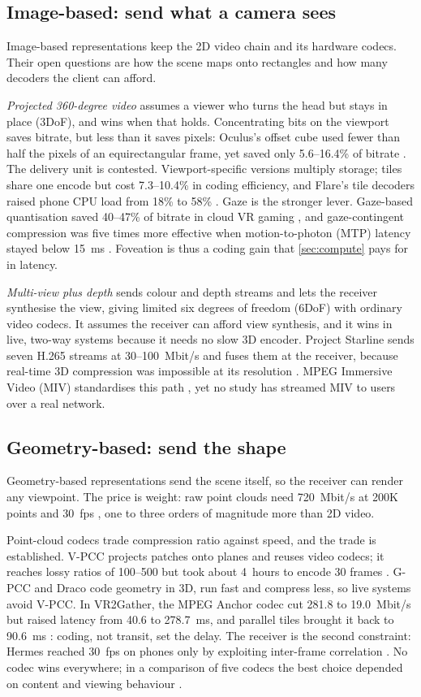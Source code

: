 \subsection{Image-based: send what a camera sees}
Image-based representations keep the 2D video chain and its hardware codecs. Their open questions are
how the scene maps onto rectangles and how many decoders the client can afford.

\emph{Projected 360-degree video} assumes a viewer who turns the head but stays in place (3DoF), and wins
when that holds. Concentrating bits on the viewport saves bitrate, but less than it saves pixels:
Oculus's offset cube used fewer than half the pixels of an equirectangular frame, yet saved only
5.6--16.4\% of bitrate \cite{W2623027537}. The delivery unit is contested. Viewport-specific versions
multiply storage; tiles share one encode but cost 7.3--10.4\% in coding efficiency, and Flare's tile
decoders raised phone CPU load from 18\% to 58\% \cite{W2896840651}. Gaze is the stronger lever.
Gaze-based quantisation saved 40--47\% of bitrate in cloud VR gaming \cite{W3174397927}, and
gaze-contingent compression was five times more effective when motion-to-photon (MTP) latency stayed
below 15~ms \cite{W4214531162}. Foveation is thus a coding gain that \cref{sec:compute} pays for in
latency.

\emph{Multi-view plus depth} sends colour and depth streams and lets the receiver synthesise the view,
giving limited six degrees of freedom (6DoF) with ordinary video codecs. It assumes the receiver can
afford view synthesis, and it wins in live, two-way systems because it needs no slow 3D encoder. Project
Starline sends seven H.265 streams at 30--100~Mbit/s and fuses them at the receiver, because real-time
3D compression was impossible at its resolution \cite{W4200107448}. MPEG Immersive
Video (MIV) standardises this path \cite{W4210296418}, yet no study has streamed MIV to users over a real
network.

\subsection{Geometry-based: send the shape}
Geometry-based representations send the scene itself, so the receiver can render any viewpoint. The
price is weight: raw point clouds need 720~Mbit/s at 200K points and 30~fps \cite{W3021314748}, one to
three orders of magnitude more than 2D video.

Point-cloud codecs trade compression ratio against speed, and the trade is established. V-PCC projects
patches onto planes and reuses video codecs; it reaches lossy ratios of 100--500 but took about 4~hours
to encode 30 frames \cite{W3096788322}. G-PCC and Draco code geometry in 3D, run fast and compress less,
so live systems avoid V-PCC. In VR2Gather, the MPEG Anchor codec cut 281.8 to 19.0~Mbit/s but raised
latency from 40.6 to 278.7~ms, and parallel tiles brought it back to 90.6~ms \cite{W4362496249}: coding,
not transit, set the delay. The receiver is the second constraint: Hermes reached 30~fps on phones only
by exploiting inter-frame correlation \cite{W4387967921}. No codec wins everywhere; in a comparison of
five codecs the best choice depended on content and viewing behaviour \cite{W4321488303}.

